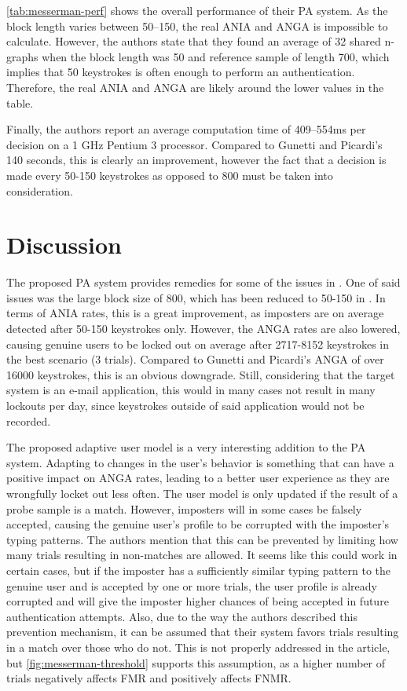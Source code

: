 \documentclass[informationsecurity]{gucmasterproject}
\begin{document}
\autoref{tab:messerman-perf} shows the overall performance of their PA system.
As the block length varies between 50--150, the real ANIA and ANGA is impossible to calculate.
However, the authors state that they found an average of 32 shared n-graphs when the block length was 50 and reference sample of length 700, which implies that 50 keystrokes is often enough to perform an authentication.
Therefore, the real ANIA and ANGA are likely around the lower values in the table.

Finally, the authors report an average computation time of 409--554ms per decision on a 1 GHz Pentium 3 processor. 
Compared to Gunetti and Picardi's 140 seconds, this is clearly an improvement, however the fact that a decision is made every 50-150 keystrokes as opposed to 800 must be taken into consideration.

\section{Discussion}
The proposed PA system provides remedies for some of the issues in \cite{gnp}.
One of said issues was the large block size of 800, which has been reduced to 50-150 in \cite{Messerman}.
In terms of ANIA rates, this is a great improvement, as imposters are on average detected after 50-150 keystrokes only.
However, the ANGA rates are also lowered, causing genuine users to be locked out on average after 2717-8152 keystrokes in the best scenario (3 trials).
Compared to Gunetti and Picardi's ANGA of over 16000 keystrokes, this is an obvious downgrade.
Still, considering that the target system is an e-mail application, this would in many cases not result in many lockouts per day, since keystrokes outside of said application would not be recorded.

The proposed adaptive user model is a very interesting addition to the PA system.
Adapting to changes in the user's behavior is something that can have a positive impact on ANGA rates, leading to a better user experience as they are wrongfully locket out less often.
The user model is only updated if the result of a probe sample is a match.
However, imposters will in some cases be falsely accepted, causing the genuine user's profile to be corrupted with the imposter's typing patterns.
The authors mention that this can be prevented by limiting how many trials resulting in non-matches are allowed.
It seems like this could work in certain cases, but if the imposter has a sufficiently similar typing pattern to the genuine user and is accepted by one or more trials, the user profile is already corrupted and will give the imposter higher chances of being accepted in future authentication attempts.
Also, due to the way the authors described this prevention mechanism, it can be assumed that their system favors trials resulting in a match over those who do not.
This is not properly addressed in the article, but \autoref{fig:messerman-threshold} supports this assumption, as a higher number of trials negatively affects FMR and positively affects FNMR.
\end{document}
